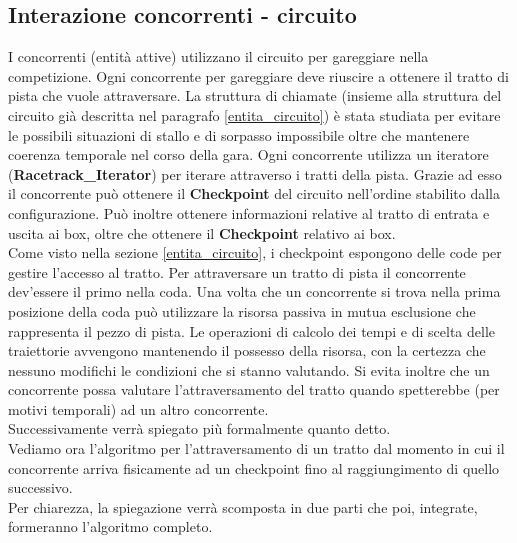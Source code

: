 \subsection{Interazione concorrenti - circuito}
I concorrenti (entità attive)
utilizzano il circuito per gareggiare nella competizione.
Ogni concorrente per gareggiare deve riuscire a ottenere il tratto di pista che
vuole attraversare. La struttura di chiamate (insieme alla struttura del
circuito già descritta nel paragrafo \ref{entita_circuito}) è stata studiata per
evitare le possibili situazioni di stallo e di sorpasso impossibile oltre che mantenere
coerenza temporale nel corso della gara. 
Ogni concorrente utilizza un iteratore (\textbf{Racetrack\_Iterator}) per iterare
attraverso i tratti della pista. Grazie ad esso il concorrente può ottenere il
\textbf{Checkpoint} del circuito nell'ordine stabilito dalla configurazione.
Può inoltre ottenere informazioni relative al tratto di entrata e uscita ai box, oltre
che ottenere il \textbf{Checkpoint} relativo ai box.\\
Come visto nella sezione \ref{entita_circuito}, i checkpoint espongono delle code
per gestire l'accesso al tratto. Per attraversare un tratto di
pista il concorrente dev'essere il primo nella coda. Una volta che un concorrente si trova nella prima posizione
della coda può utilizzare la risorsa passiva in mutua esclusione che rappresenta
il pezzo di pista. Le operazioni di calcolo dei tempi e di scelta delle
traiettorie avvengono mantenendo il possesso della risorsa, con la certezza che
nessuno modifichi le condizioni che si stanno valutando. Si evita inoltre che un concorrente
possa valutare l'attraversamento del tratto quando spetterebbe (per motivi temporali) ad un
altro concorrente.\\
Successivamente verrà spiegato più formalmente quanto detto.\\
Vediamo ora l'algoritmo per l'attraversamento di un
tratto dal momento in cui il concorrente arriva 
fisicamente ad un checkpoint
fino al raggiungimento di quello successivo.\\
Per chiarezza, la spiegazione verrà scomposta in due parti che poi, integrate,
formeranno l'algoritmo completo.
